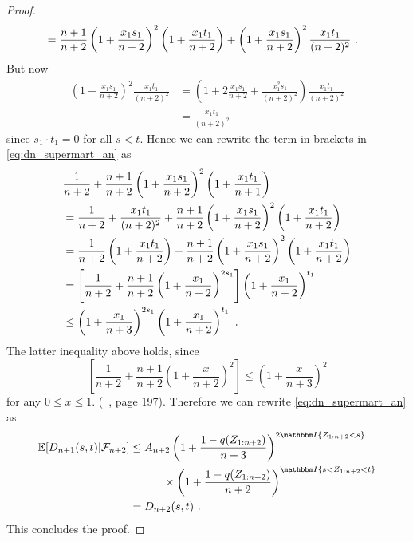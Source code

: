 \begin{lemma}
\begin{proof}
\begin{align*}
		&= \frac{n+1}{n+2}\left(1+\frac{x_1s_1}{n+2}\right)^{2}\left(1+\frac{x_1t_1}{n+2}\right) + \left(1+\frac{x_1s_1}{n+2}\right)^{2}\frac{x_1t_1}{(n+2)^2}\textrm{ .} 
		\end{align*}
		But now 
		\begin{align*}
		\left(1+\frac{x_1s_1}{n+2}\right)^{2}\frac{x_1t_1}{(n+2)^2} &= \left(1+2\frac{x_1s_1}{n+2}+\frac{x^2_1s_1}{(n+2)^2}\right)\frac{x_1t_1}{(n+2)^2}\\
		&= \frac{x_1t_1}{(n+2)^2}
		\end{align*}
		since $s_1\cdot t_1=0$ for all $s<t$. Hence we can rewrite the term in brackets in \eqref{eq:dn_supermart_an} as 
		\begin{align*}
		&\frac{1}{n+2} + \frac{n+1}{n+2}\left(1+\frac{x_1s_1}{n+2}\right)^{2} \left(1+\frac{x_1t_1}{n+1}\right) \\
		&=\frac{1}{n+2} + \frac{x_1t_1}{(n+2)^2} + \frac{n+1}{n+2}\left(1+\frac{x_1s_1}{n+2}\right)^{2}\left(1+\frac{x_1t_1}{n+2}\right)\\
		&=\frac{1}{n+2}\left(1+\frac{x_1t_1}{n+2}\right) + \frac{n+1}{n+2}\left(1+\frac{x_1s_1}{n+2}\right)^{2}\left(1+\frac{x_1t_1}{n+2}\right)\\
		&=\left[\frac{1}{n+2} + \frac{n+1}{n+2}\left(1+\frac{x_1}{n+2}\right)^{2s_1}\right]\left(1+\frac{x_1}{n+2}\right)^{t_1}\\
		&\leq \left(1+\frac{x_1}{n+3}\right)^{2s_1}\left(1+\frac{x_1}{n+2}\right)^{t_1}\textrm{ .} 
		\end{align*}
		The latter inequality above holds, since 
		$$\left[\frac{1}{n+2} + \frac{n+1}{n+2}\left(1+\frac{x}{n+2}\right)^{2}\right] \leq \left(1+\frac{x}{n+3}\right)^{2}$$
		for any $0\leq x\leq 1$. (\cf\ \cite{bose1999strong}, page 197). Therefore we can rewrite \eqref{eq:dn_supermart_an} as
		\begin{align*}
		\E[D_{n+1}(s,t)| \F_{n+2}]	&\leq A_{n+2} \left(1+\frac{1-q(Z_{1:n+2})}{n+3}\right)^{2\I{Z_{1:n+2}<s}} \\
		&\qquad\quad \times \left(1+\frac{1-q(Z_{1:n+2})}{n+2}\right)^{\I{s<Z_{1:n+2} <t}}\\
		&= D_{n+2}(s,t)\mdot
		\end{align*}		
		This concludes the proof.
	\end{proof}
\end{lemma}
%

